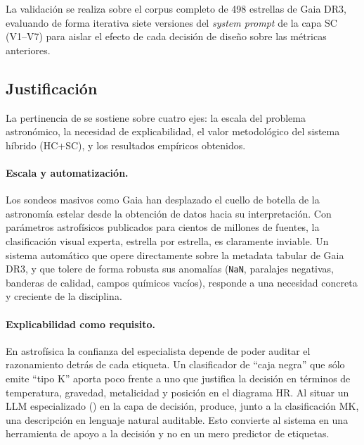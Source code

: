 La validación se realiza sobre el corpus completo de \num{498} estrellas de
Gaia DR3, evaluando de forma iterativa siete versiones del \emph{system prompt}
de la capa SC (V1--V7) para aislar el efecto de cada decisión de diseño sobre
las métricas anteriores.

\subsection{Justificación}
\label{sec:justificacion}

La pertinencia de \STELLAR{} se sostiene sobre cuatro ejes: la escala del
problema astronómico, la necesidad de explicabilidad, el valor metodológico del sistema 
híbrido (HC+SC), y los resultados empíricos obtenidos.

\paragraph{Escala y automatización.} Los sondeos masivos como Gaia han
desplazado el cuello de botella de la astronomía estelar desde la obtención de
datos hacia su interpretación. Con parámetros astrofísicos publicados para
cientos de millones de fuentes, la clasificación visual experta, estrella por
estrella, es claramente inviable. Un sistema automático que opere directamente sobre 
la metadata tabular de Gaia DR3, y que tolere de forma robusta sus anomalías
(\texttt{NaN}, paralajes negativas, banderas de calidad, campos químicos
vacíos), responde a una necesidad concreta y creciente de la disciplina.

\paragraph{Explicabilidad como requisito.} En astrofísica la
confianza del especialista depende de poder auditar el razonamiento detrás de
cada etiqueta. Un clasificador de ``caja negra'' que sólo emite ``tipo K'' aporta
poco frente a uno que justifica la decisión en términos de temperatura,
gravedad, metalicidad y posición en el diagrama HR. Al situar un LLM
especializado (\AstroSage{}) en la capa de decisión, \STELLAR{} produce, junto
a la clasificación MK, una descripción en lenguaje natural auditable. Esto
convierte al sistema en una herramienta de apoyo a la decisión y no en un mero
predictor de etiquetas.

